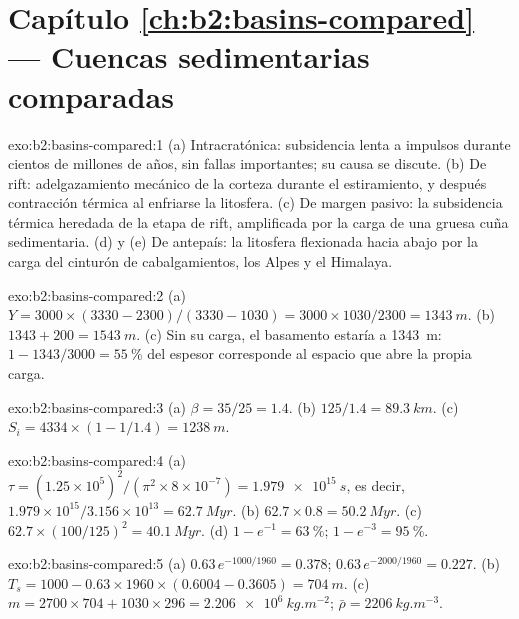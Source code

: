 \section*{Capítulo \ref{ch:b2:basins-compared} --- Cuencas sedimentarias comparadas}

\begin{solution}{exo:b2:basins-compared:1}
(a) Intracratónica: subsidencia lenta a impulsos durante cientos de millones de años, sin fallas
importantes; su causa se discute. (b) De rift: adelgazamiento mecánico de la corteza durante el estiramiento,
y después contracción térmica al enfriarse la litosfera. (c) De margen pasivo: la subsidencia térmica
heredada de la etapa de rift, amplificada por la carga de una gruesa cuña sedimentaria. (d) y (e)
De antepaís: la litosfera flexionada hacia abajo por la carga del cinturón de cabalgamientos, los Alpes y el Himalaya.
\end{solution}

\begin{solution}{exo:b2:basins-compared:2}
(a) $Y = 3000\times(3330 - 2300)/(3330 - 1030) = 3000\times1030/2300 = \qty{1343}{m}$.
(b) $1343 + 200 = \qty{1543}{m}$. (c) Sin su carga, el basamento estaría a \qty{1343}{m}:
$1 - 1343/3000 = \qty{55}{\percent}$ del espesor corresponde al espacio que abre la propia carga.
\end{solution}

\begin{solution}{exo:b2:basins-compared:3}
(a) $\beta = 35/25 = 1.4$. (b) $125/1.4 = \qty{89.3}{km}$. (c) $S_i = 4334\times(1 - 1/1.4) =
\qty{1238}{m}$.
\end{solution}

\begin{solution}{exo:b2:basins-compared:4}
(a) $\tau = (1.25\times10^{5})^2/(\pi^2\times8\times10^{-7}) = \qty{1.979e15}{s}$, es decir,
$1.979\times10^{15}/3.156\times10^{13} = \qty{62.7}{Myr}$. (b) $62.7\times0.8 = \qty{50.2}{Myr}$.
(c) $62.7\times(100/125)^2 = \qty{40.1}{Myr}$. (d) $1 - e^{-1} = \qty{63}{\percent}$; $1 -
e^{-3} = \qty{95}{\percent}$.
\end{solution}

\begin{solution}{exo:b2:basins-compared:5}
(a) $0.63\,e^{-1000/1960} = 0.378$; $0.63\,e^{-2000/1960} = 0.227$. (b) $T_s = 1000 -
0.63\times1960\times(0.6004 - 0.3605) = \qty{704}{m}$. (c) $m = 2700\times704 + 1030\times296 =
\qty{2.206e6}{kg.m^{-2}}$; $\bar\rho = \qty{2206}{kg.m^{-3}}$.
\end{solution}

